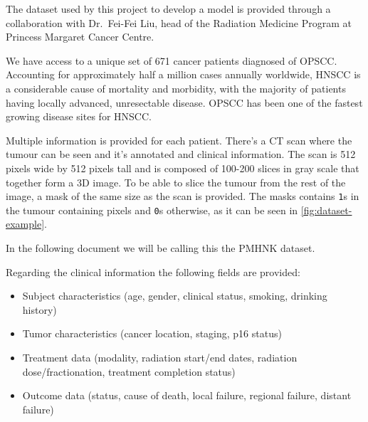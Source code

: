 
The dataset used by this project to develop a model is provided through a 
collaboration with Dr.~Fei-Fei Liu, head of the Radiation Medicine Program at Princess
Margaret Cancer Centre.

We have access to a unique set of 671 cancer patients diagnosed of \gls{OPSCC}. Accounting
for approximately half a million cases annually worldwide, \gls{HNSCC} 
is a considerable cause of mortality and morbidity, with the majority of patients having
locally advanced, unresectable disease. \gls{OPSCC} has been one of the fastest growing 
disease sites for \gls{HNSCC}.
~\cite{medical:ct-based-radiomic-signature}

Multiple information is provided for each patient. There's a \gls{CT} scan where the tumour 
can be seen and it's annotated and clinical information. The scan is 512 pixels wide by 512 
pixels tall and is composed of 100-200 slices in gray scale that together form a 3D image. 
To be able to slice the tumour from the rest of the image, a mask of the same size as the scan 
is provided. The masks contains \texttt{1}s in the tumour containing pixels and \texttt{0}s
otherwise, as it can be seen in \autoref{fig:dataset-example}.

In the following document we will be calling this the \gls{PMHNK} dataset.

Regarding the clinical information the following fields are provided:
\begin{itemize}
  \item Subject characteristics (age, gender, clinical status, smoking, drinking history)
  \item Tumor characteristics (cancer location, staging, p16 status)
  \item Treatment data (modality, radiation start/end dates, radiation dose/fractionation, 
  treatment completion status)
  \item Outcome data (status, cause of death, local failure, regional failure, distant failure)
\end{itemize}

